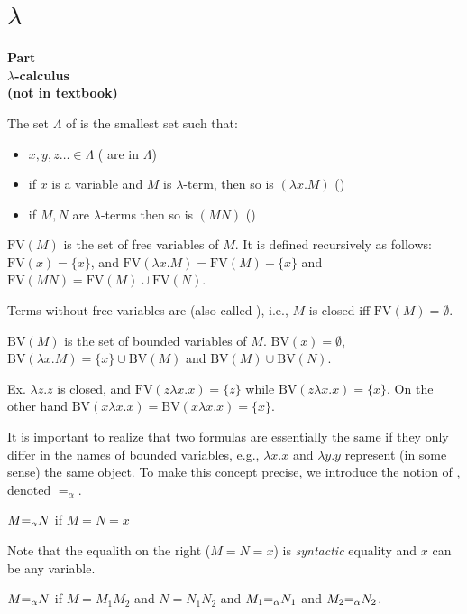 
\newcommand{\mytitle}{Computational Foundations: Appendix}
\newcommand{\mychpnr}{9}

\section{$\lambda$}

\begin{frame}
\begin{center}
\addtocounter{part}{1}
{\bf Part  \\ $\lambda$-calculus \\ (not in textbook)} 
\end{center}
\end{frame}

\begin{frame}

The set $\Lambda$ of  is the smallest set such
that:
\begin{itemize}
\item $x,y,z\ldots\in\Lambda$ ( are in $\Lambda$)
\item if $x$ is a variable and $M$ is $\lambda$-term, then so is
$(\lambda x.M)$ ()
\item if $M,N$ are $\lambda$-terms then so is $(MN)$
()
\end{itemize}

$\text{FV}(M)$ is the set of free variables of $M$.  It is defined
recursively as follows: $\text{FV}(x)=\{x\}$, and $\text{FV}(\lambda
x.M)=\text{FV}(M)-\{x\}$ and
$\text{FV}(MN)=\text{FV}(M)\cup\text{FV}(N)$.

Terms without free variables are  (also called
), i.e., $M$ is closed iff $\text{FV}(M)=\emptyset$.

$\text{BV}(M)$ is the set of bounded variables of $M$.
$\text{BV}(x)=\emptyset$, $\text{BV}(\lambda
x.M)=\{x\}\cup\text{BV}(M)$ and $\text{BV}(M)\cup\text{BV}(N)$.
\end{frame}

\begin{frame}
Ex. $\lambda z.z$ is closed, and $\text{FV}(z\lambda x.x)=\{z\}$ while
$\text{BV}(z\lambda x.x)=\{x\}$.  On the other hand
$\text{BV}(x\lambda x.x)=\text{BV}(x\lambda x.x)=\{x\}$.

It is important to realize that two formulas are essentially the same
if they only differ in the names of bounded variables, e.g., $\lambda
x.x$ and $\lambda y.y$ represent (in some sense) the same object.  To
make this concept precise, we introduce the notion of
, denoted $=_\alpha$.

$M{=_\alpha} N$ if $M=N=x$

Note that the equalith on the right ($M=N=x$) is {\em syntactic}
equality and $x$ can be any variable.

$M{=_\alpha} N$ if $M=M_1M_2$ and $N=N_1N_2$ and $M_1{=_\alpha} N_1$ and $M_2{=_\alpha}
N_2$.
\end{frame}

